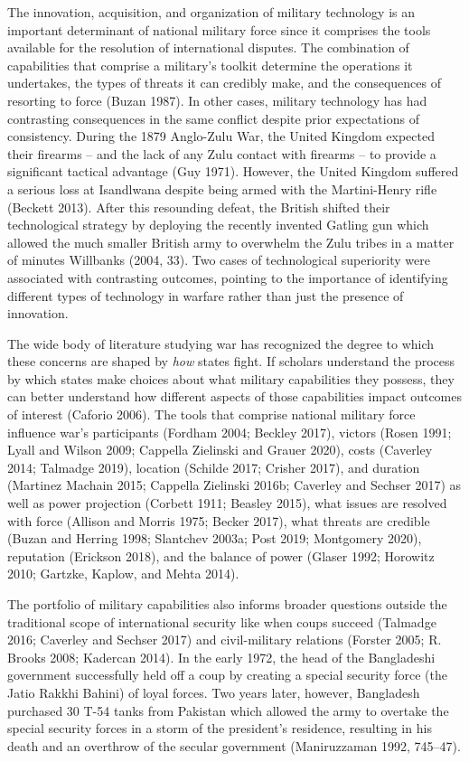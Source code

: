 \documentclass[
]{article}
\begin{document}
The innovation, acquisition, and organization of military technology is an important determinant of national military force since it comprises the tools available for the resolution of international disputes. The combination of capabilities that comprise a military's toolkit determine the operations it undertakes, the types of threats it can credibly make, and the consequences of resorting to force (Buzan 1987). In other cases, military technology has had contrasting consequences in the same conflict despite prior expectations of consistency. During the 1879 Anglo-Zulu War, the United Kingdom expected their firearms -- and the lack of any Zulu contact with firearms -- to provide a significant tactical advantage (Guy 1971). However, the United Kingdom suffered a serious loss at Isandlwana despite being armed with the Martini-Henry rifle (Beckett 2013). After this resounding defeat, the British shifted their technological strategy by deploying the recently invented Gatling gun which allowed the much smaller British army to overwhelm the Zulu tribes in a matter of minutes Willbanks (2004, 33). Two cases of technological superiority were associated with contrasting outcomes, pointing to the importance of identifying different types of technology in warfare rather than just the presence of innovation.

The wide body of literature studying war has recognized the degree to which these concerns are shaped by \textit{how} states fight. If scholars understand the process by which states make choices about what military capabilities they possess, they can better understand how different aspects of those capabilities impact outcomes of interest (Caforio 2006). The tools that comprise national military force influence war's participants (Fordham 2004; Beckley 2017), victors (Rosen 1991; Lyall and Wilson 2009; Cappella Zielinski and Grauer 2020), costs (Caverley 2014; Talmadge 2019), location (Schilde 2017; Crisher 2017), and duration (Martinez Machain 2015; Cappella Zielinski 2016b; Caverley and Sechser 2017) as well as power projection (Corbett 1911; Beasley 2015), what issues are resolved with force (Allison and Morris 1975; Becker 2017), what threats are credible (Buzan and Herring 1998; Slantchev 2003a; Post 2019; Montgomery 2020), reputation (Erickson 2018), and the balance of power (Glaser 1992; Horowitz 2010; Gartzke, Kaplow, and Mehta 2014).

The portfolio of military capabilities also informs broader questions outside the traditional scope of international security like when coups succeed (Talmadge 2016; Caverley and Sechser 2017) and civil-military relations (Forster 2005; R. Brooks 2008; Kadercan 2014). In the early 1972, the head of the Bangladeshi government successfully held off a coup by creating a special security force (the Jatio Rakkhi Bahini) of loyal forces. Two years later, however, Bangladesh purchased 30 T-54 tanks from Pakistan which allowed the army to overtake the special security forces in a storm of the president's residence, resulting in his death and an overthrow of the secular government (Maniruzzaman 1992, 745--47).
\end{document}
